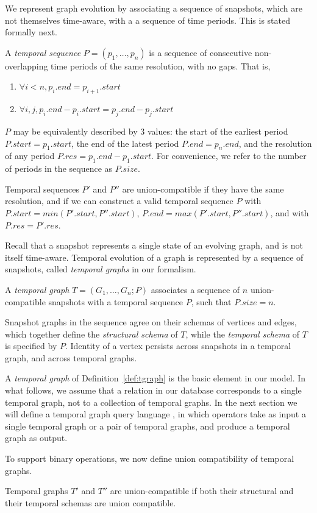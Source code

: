 We represent graph evolution by associating a sequence of snapshots,
which are not themselves time-aware, with a a sequence of time
periods.  This is stated formally next.

\begin{definition}
\label{def:tseq}
A {\em temporal sequence} $P = (p_1, \ldots, p_n)$ is a
sequence of consecutive non-overlapping time periods of the same
resolution, with no gaps.  That is,

\begin{enumerate}
\item $\forall i < n, p_i.end = p_{i+1}.start$
\item $\forall i, j, p_i.end - p_i.start = p_j.end - p_j.start$  
\end{enumerate}
\end{definition}

$P$ may be equivalently described by 3 values: the start of the
earliest period $P.start = p_1.start$, the end of the latest period
$P.end = p_n.end$, and the resolution of any period $P.res = p_1.end -
p_1.start$. For convenience, we refer to the number of periods in the
sequence as $P.size$.

\begin{definition}
\label{def:tunion}
Temporal sequences $P'$ and $P''$ are union-compatible if they have
the same resolution, and if we can construct a valid temporal sequence
$P$ with $P.start = min(P'.start, P''.start)$, $P.end = max(P'.start,
P''.start)$, and with $P.res = P'.res$.
\end{definition}

Recall that a snapshot represents a single state of an evolving graph,
and is not itself time-aware.  Temporal evolution of a graph is
represented by a sequence of snapshots, called {\em temporal graphs}
in our formalism. 

\begin{definition}
\label{def:tgraph}
A {\em temporal graph} $T = (G_1, \ldots, G_n; P)$ associates a
sequence of $n$ union-compatible snapshots with a temporal sequence
$P$, such that $P.size = n$.
\end{definition}

Snapshot graphs in the sequence agree on their schemas of vertices and
edges, which together define the {\em structural schema} of $T$, while
the {\em temporal schema} of $T$ is specified by $P$.  Identity of a
vertex persists across snapshots in a temporal graph, and across
temporal graphs.

A {\em temporal graph} of Definition~\ref{def:tgraph} is the basic
element in our model.  In what follows, we assume that a relation in
our database corresponds to a single temporal graph, not to a
collection of temporal graphs.  In the next section we will define a
temporal graph query language \ql, in which operators take as input a
single temporal graph or a pair of temporal graphs, and produce a
temporal graph as output.

To support binary operations, we now define union compatibility of
temporal graphs.

\begin{definition}
\label{def:tuc}
Temporal graphs $T'$ and $T''$ are union-compatible if both their
structural and their temporal schemas are union compatible. 
\end{definition}




